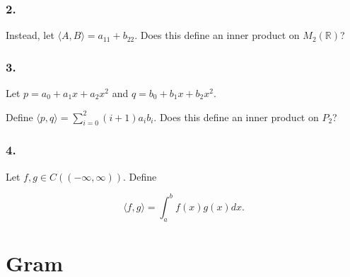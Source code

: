 \documentclass[a4paper,10pt]{report}
\begin{document}
\subsubsection{2.}
Instead, let $\langle A,B\rangle = a_{11} + b_{22}$. Does this define an inner product on $M_2(\mathbb{R})$?

\subsubsection{3.}
Let $p=a_0 + a_1 x + a_2 x^2$ and $q=b_0 + b_1 x + b_2 x^2$.

Define $\langle p,q\rangle = \sum_{i=0}^{2}(i+1)a_i b_i$. Does this define an inner product on $P_2$?

\subsubsection{4.}
Let $f,g \in C((-\infty, \infty))$. Define

\begin{equation*}
\langle f,g\rangle = \int_a^b f(x)g(x)dx.
\end{equation*}

\section{Gram}
\end{document}
